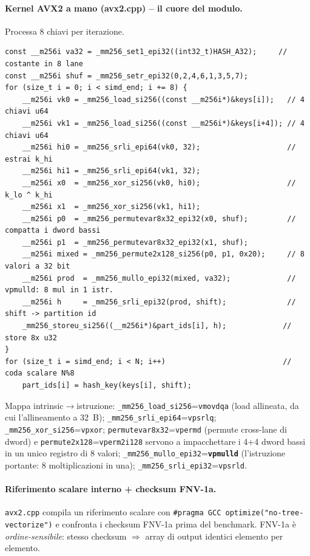 \documentclass[11pt,a4paper]{article}
\begin{document}
\paragraph{Kernel AVX2 a mano (avx2.cpp) -- il cuore del modulo.} Processa 8 chiavi per iterazione.

\begin{lstlisting}[style=cpp]
const __m256i va32 = _mm256_set1_epi32((int32_t)HASH_A32);     // costante in 8 lane
const __m256i shuf = _mm256_setr_epi32(0,2,4,6,1,3,5,7);
for (size_t i = 0; i < simd_end; i += 8) {
    __m256i vk0 = _mm256_load_si256((const __m256i*)&keys[i]);   // 4 chiavi u64
    __m256i vk1 = _mm256_load_si256((const __m256i*)&keys[i+4]); // 4 chiavi u64
    __m256i hi0 = _mm256_srli_epi64(vk0, 32);                    // estrai k_hi
    __m256i hi1 = _mm256_srli_epi64(vk1, 32);
    __m256i x0  = _mm256_xor_si256(vk0, hi0);                    // k_lo ^ k_hi
    __m256i x1  = _mm256_xor_si256(vk1, hi1);
    __m256i p0  = _mm256_permutevar8x32_epi32(x0, shuf);         // compatta i dword bassi
    __m256i p1  = _mm256_permutevar8x32_epi32(x1, shuf);
    __m256i mixed = _mm256_permute2x128_si256(p0, p1, 0x20);     // 8 valori a 32 bit
    __m256i prod  = _mm256_mullo_epi32(mixed, va32);             // vpmulld: 8 mul in 1 istr.
    __m256i h     = _mm256_srli_epi32(prod, shift);              // shift -> partition id
    _mm256_storeu_si256((__m256i*)&part_ids[i], h);             // store 8x u32
}
for (size_t i = simd_end; i < N; i++)                           // coda scalare N%8
    part_ids[i] = hash_key(keys[i], shift);
\end{lstlisting}

Mappa intrinsic$\to$istruzione: \texttt{\_mm256\_load\_si256}=\texttt{vmovdqa} (load allineata, da cui l'allineamento a 32~B); \texttt{\_mm256\_srli\_epi64}=\texttt{vpsrlq}; \texttt{\_mm256\_xor\_si256}=\texttt{vpxor}; \texttt{permutevar8x32}=\texttt{vpermd} (permute cross-lane di dword) e \texttt{permute2x128}=\texttt{vperm2i128} servono a impacchettare i 4+4 dword bassi in un unico registro di 8 valori; \texttt{\_mm256\_mullo\_epi32}=\textbf{\texttt{vpmulld}} (l'istruzione portante: 8 moltiplicazioni in una); \texttt{\_mm256\_srli\_epi32}=\texttt{vpsrld}.

\paragraph{Riferimento scalare interno + checksum FNV-1a.} \texttt{avx2.cpp} compila un riferimento scalare con \texttt{\#pragma GCC optimize("no-tree-vectorize")} e confronta i checksum FNV-1a prima del benchmark. FNV-1a è \emph{ordine-sensibile}: stesso checksum $\Rightarrow$ array di output identici elemento per elemento.
\end{document}
